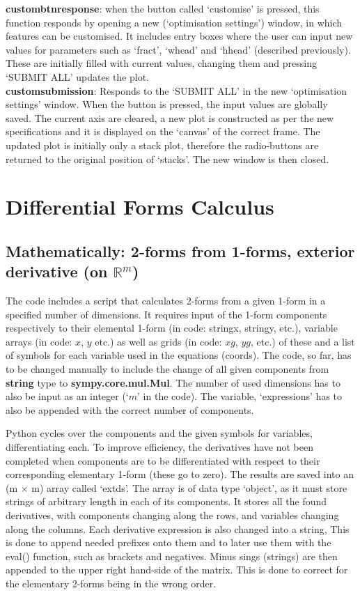 \documentclass[12pt]{report}
\begin{document}
\textbf{custom\textunderscore btn\textunderscore response}: when the button called `customise' is pressed, this function responds by opening a new (`optimisation settings') window, in which features can be customised. It includes entry boxes where the user can input new values for parameters such as `fract', `w\textunderscore head' and `h\textunderscore head' (described previously). These are initially filled with current values, changing them and pressing `SUBMIT ALL' updates the plot.\\
\textbf{custom\textunderscore submission}: Responds to the `SUBMIT ALL' in the new `optimisation settings' window. When the button is pressed, the input values are globally saved. The current axis are cleared, a new plot is constructed as per the new specifications and it is displayed on the `canvas' of the correct frame. The updated plot is initially only a stack plot, therefore the radio-buttons are returned to the original position of `stacks'. The new window is then closed.

\chapter{Differential Forms Calculus}

\section{Mathematically: 2-forms from 1-forms, exterior derivative (on $\mathbb{R}^{m}$)}
The code includes a script that calculates 2-forms from a given 1-form in a specified number of dimensions.
It requires input of the 1-form components respectively to their elemental 1-form (in code: string\textunderscore x, string\textunderscore y, etc.), variable arrays (in code: $x$, $y$ etc.) as well as grids (in code: $xg$, $yg$, etc.) of these and a list of symbols for each variable used in the equations (coords).
The code, so far, has to be changed manually to include the change of all given components from \textbf{string} type to \textbf{sympy.core.mul.Mul}. The number of used dimensions has to also be input as an integer (`$m$' in the code). The variable, `expressions' has to also be appended with the correct number of components.

\noindent Python cycles over the components and the given symbols for variables, differentiating each. To improve efficiency, the derivatives have not been completed when components are to be differentiated with respect to their corresponding elementary 1-form (these go to zero). The results are saved into an (m $\times$ m) array called `ext\textunderscore ds'. The array is of data type `object', as it must store strings of arbitrary length in each of its components. It stores all the found derivatives, with components changing along the rows, and variables changing along the columns.
Each derivative expression is also changed into a string, This is done to append needed prefixes onto them and to later use them with the eval() function, such as brackets and negatives. Minus sings (strings) are then appended to the upper right hand-side of the matrix. This is done to correct for the elementary 2-forms being in the wrong order.
\end{document}
